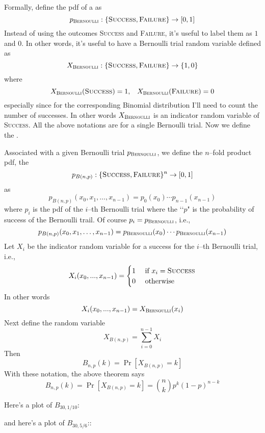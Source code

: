 Formally, define the pdf of a  as
\[
p_{\textsc{Bernoulli}}: \{\textsc{Success}, \textsc{Failure}\} \rightarrow [0, 1]
\]
Instead of using the outcomes \textsc{Success}
and \textsc{Failure}, it's useful to label them as $1$ and $0$.
In other words, it's useful to have a Bernoulli trial random variable
defined as
\[
X_{\textsc{Bernoulli}} : \{\textsc{Success}, \textsc{Failure}\} \rightarrow \{1, 0\}
\]
where
\[
X_{\textsc{Bernoulli}}(\textsc{Success}) = 1, \,\,\,\,\,
X_{\textsc{Bernoulli}}(\textsc{Failure}) = 0
\]
especially since for the corresponding Binomial distribution I'll
need to count the number of successes.
In other words $X_{\textsc{Bernoulli}}$
is an indicator random variable of \textsc{Success}.
All the above notations are for a single Bernoulli trial.
Now we define the .

Associated with a given Bernoulli trial
$p_{\textsc{Bernoulli}}$, 
we define the $n$--fold product pdf,
the  
\[
p_{B(n,p)}:
\{\textsc{Success}, \textsc{Failure}\}^n \rightarrow [0, 1]
\]
as
\[
p_{B(n,p)}(x_0, x_1, \ldots, x_{n - 1}) =
p_0(x_0) \cdots p_{n-1}(x_{n-1})
\]
where $p_i$ is the pdf of the $i$--th Bernoulli trial
where the \lq\lq $p$" is the probability of success of
the Bernoulli trail.
Of course $p_i = p_{\textsc{Bernoulli}}$, i.e.,
\[
p_{B(n,p)}(x_0, x_1, \ldots, x_{n - 1}) =
p_{\textsc{Bernoulli}}(x_0) \cdots p_{\textsc{Bernoulli}}(x_{n-1})
\]
Let $X_i$ be the indicator random variable for a success
for the $i$--th Bernoulli trial, i.e.,
\[
X_i(x_0, ..., x_{n-1})
=
\begin{cases}
  1 & \text{ if } x_i = \textsc{Success}\\
  0 & \text{ otherwise}\\
\end{cases}
\]
In other words
\[
X_i(x_0, ..., x_{n-1}) = X_{\textsc{Bernoulli}}(x_i)
\]
Next define the random variable
\[
X_{B(n,p)} = \sum_{i=0}^{n-1} X_i
\]
Then
\[
B_{n,p}(k) = \Pr[X_{B(n,p)} = k]
\]
With these notation, the above theorem says
\[
B_{n,p}(k) = \Pr[X_{B(n,p)} = k] = \binom{n}{k} p^k (1 - p)^{n-k}
\]

Here's a plot of $B_{30, 1/10}$:

and here's a plot of $B_{30, 5/6}$::


\newpage







